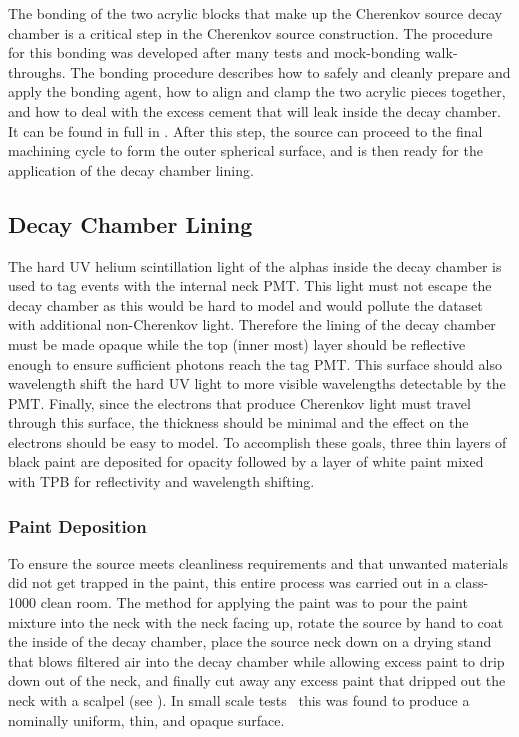The bonding of the two acrylic blocks that make up the Cherenkov source decay chamber is a critical step in the Cherenkov source construction. 
The procedure for this bonding was developed after many tests and mock-bonding walk-throughs. 
The bonding procedure describes how to safely and cleanly prepare and apply the bonding agent, how to align and clamp the two acrylic pieces together, and how to deal with the excess cement that will leak inside the decay chamber.
It can be found in full in .
After this step, the source can proceed to the final machining cycle to form the outer spherical surface, and is then ready for the application of the decay chamber lining.

\subsection{Decay Chamber Lining}
\label{sec:lining}

The hard UV helium scintillation light of the alphas inside the decay chamber is used to tag events with the internal neck PMT. 
This light must not escape the decay chamber as this would be hard to model and would pollute the dataset with additional non-Cherenkov light. 
Therefore the lining of the decay chamber must be made opaque while the top (inner most) layer should be reflective enough to ensure sufficient photons reach the tag PMT. 
This surface should also wavelength shift the hard UV light to more visible wavelengths detectable by the PMT.
Finally, since the electrons that produce Cherenkov light must travel through this surface, the thickness should be minimal and the effect on the electrons should be easy to model. 
To accomplish these goals, three thin layers of black paint are deposited for opacity followed by a layer of white paint mixed with TPB for reflectivity and wavelength shifting. 


\subsubsection{Paint Deposition}

To ensure the source meets cleanliness requirements and that unwanted materials did not get trapped in the paint, this entire process was carried out in a class-1000 clean room.
The method for applying the paint was to pour the paint mixture into the neck with the neck facing up, rotate the source by hand to coat the inside of the decay chamber, place the source neck down on a drying stand that blows filtered air into the decay chamber while allowing excess paint to drip down out of the neck, and finally cut away any excess paint that dripped out the neck with a scalpel (see ). 
In small scale tests~\cite{tanner:2014} this was found to produce a nominally uniform, thin, and opaque surface.


